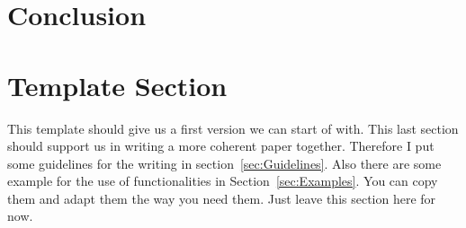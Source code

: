 \documentclass[12pt]{article}
\begin{document}
\section{Conclusion} \label{sec:Conclusion} %



\section{Template Section} \label{sec:Template}
    This template should give us a first version we can start of with. This last section should support us in writing a more coherent paper together. Therefore I put some guidelines for the writing in section~\ref{sec:Guidelines}. Also there are some example for the use of functionalities in Section~\ref{sec:Examples}. You can copy them and adapt them the way you need them. Just leave this section here for now.
\end{document}
